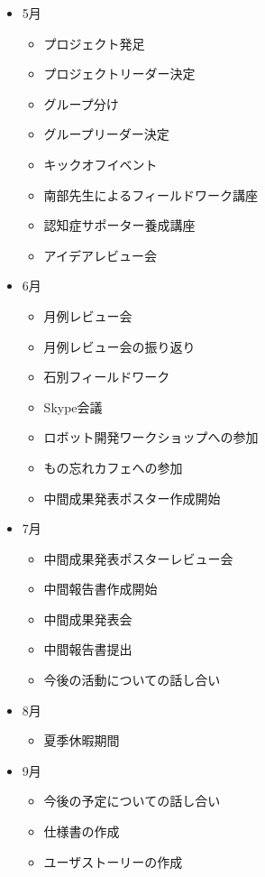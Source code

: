 \documentclass[../report]{subfiles}
\begin{document}
\begin{itemize}
  \item[] 5月
    \begin{itemize}
      \item プロジェクト発足
      \item プロジェクトリーダー決定
      \item グループ分け
      \item グループリーダー決定
      \item キックオフイベント
      \item 南部先生によるフィールドワーク講座
      \item 認知症サポーター養成講座
      \item アイデアレビュー会
    \end{itemize}
  \item[] 6月
    \begin{itemize}
      \item 月例レビュー会
      \item 月例レビュー会の振り返り
      \item 石別フィールドワーク
      \item Skype会議
      \item ロボット開発ワークショップへの参加
      \item もの忘れカフェへの参加
      \item 中間成果発表ポスター作成開始
    \end{itemize}
  \item[] 7月
    \begin{itemize}
      \item 中間成果発表ポスターレビュー会
      \item 中間報告書作成開始
      \item 中間成果発表会
      \item 中間報告書提出
      \item 今後の活動についての話し合い
    \end{itemize}
  \item[] 8月
    \begin{itemize}
      \item 夏季休暇期間
    \end{itemize}
  \item[] 9月
    \begin{itemize}
      \item 今後の予定についての話し合い
      \item 仕様書の作成
      \item ユーザストーリーの作成

\end{itemize}
\end{itemize}
\end{document}
